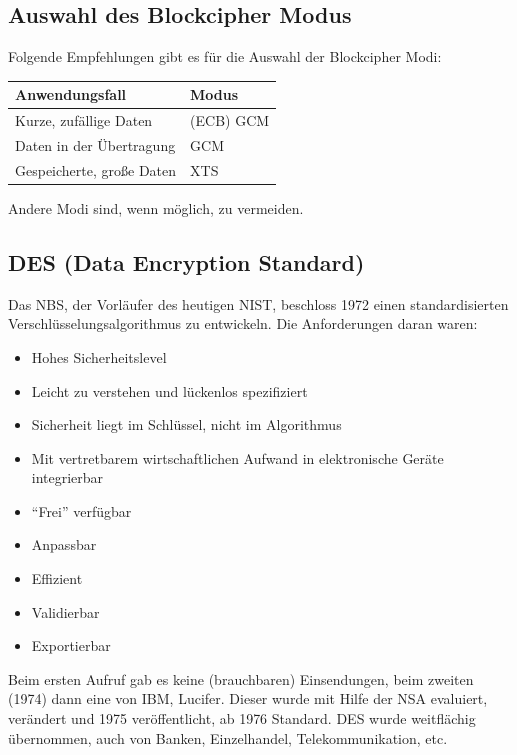 \subsection{Auswahl des Blockcipher Modus}

Folgende Empfehlungen gibt es für die Auswahl der Blockcipher Modi:

\begin{center}
    \begin{tabular}{ ll } 
        \hline
        Anwendungsfall & Modus \\ 
        \hline
        Kurze, zufällige Daten & (ECB) GCM \\
        Daten in der Übertragung & GCM \\
        Gespeicherte, große Daten & XTS \\
        \hline
    \end{tabular}
\end{center}

Andere Modi sind, wenn möglich, zu vermeiden.

\subsection{DES (Data Encryption Standard)}

Das NBS, der Vorläufer des heutigen NIST, beschloss 1972 einen standardisierten Verschlüsselungsalgorithmus zu entwickeln. Die Anforderungen daran waren:

\begin{itemize}
    \item Hohes Sicherheitslevel
    \item Leicht zu verstehen und lückenlos spezifiziert
    \item Sicherheit liegt im Schlüssel, nicht im Algorithmus
    \item Mit vertretbarem wirtschaftlichen Aufwand in elektronische Geräte integrierbar
    \item ``Frei'' verfügbar
    \item Anpassbar
    \item Effizient
    \item Validierbar
    \item Exportierbar
\end{itemize}

Beim ersten Aufruf gab es keine (brauchbaren) Einsendungen, beim zweiten (1974) dann eine von IBM, Lucifer. Dieser wurde mit Hilfe der NSA evaluiert, verändert und 
1975 veröffentlicht, ab 1976 Standard. DES wurde weitflächig übernommen, auch von Banken, Einzelhandel, Telekommunikation, etc.

